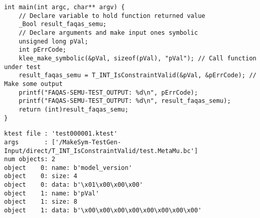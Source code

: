 
\begin{lstlisting}[style=CStyle, caption=SEMuS test template., label=test_template]
int main(int argc, char** argv) {
    // Declare variable to hold function returned value
    _Bool result_faqas_semu; 
    // Declare arguments and make input ones symbolic
    unsigned long pVal;
    int pErrCode;
    klee_make_symbolic(&pVal, sizeof(pVal), "pVal"); // Call function under test
    result_faqas_semu = T_INT_IsConstraintValid(&pVal, &pErrCode); // Make some output
    printf("FAQAS-SEMU-TEST_OUTPUT: %d\n", pErrCode);
    printf("FAQAS-SEMU-TEST_OUTPUT: %d\n", result_faqas_semu);
    return (int)result_faqas_semu;
}

\end{lstlisting}


\begin{lstlisting}[language={}, caption=Klee-test output, label=ktest]
ktest file : 'test000001.ktest'
args       : ['/MakeSym-TestGen-Input/direct/T_INT_IsConstraintValid/test.MetaMu.bc']
num objects: 2
object    0: name: b'model_version'
object    0: size: 4
object    0: data: b'\x01\x00\x00\x00'
object    1: name: b'pVal'
object    1: size: 8
object    1: data: b'\x00\x00\x00\x00\x00\x00\x00\x00'
\end{lstlisting}
